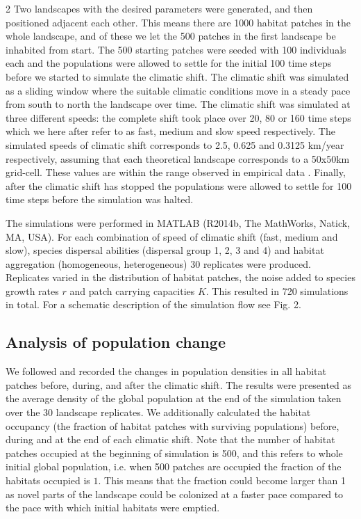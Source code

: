 \documentclass[12pt,pdftex]{article}
\begin{document}
\begin{spacing}{2}
Two landscapes with the desired parameters were generated, and then positioned adjacent each other. This means there are 1000 habitat patches in the whole landscape, and of these we let the 500 patches in the first landscape be inhabited from start. The 500 starting patches were seeded with 100 individuals each and the populations were allowed to settle for the initial 100 time steps before we started to simulate the climatic shift. The climatic shift was simulated as a sliding window where the suitable climatic conditions move in a steady pace from south to north the landscape over time. The climatic shift was simulated at three different speeds: the complete shift took place over 20, 80 or 160 time steps which we here after refer to as fast, medium and slow speed respectively. The simulated speeds of climatic shift corresponds to 2.5, 0.625 and 0.3125 km/year respectively, assuming that each theoretical landscape  corresponds to a 50x50km grid-cell. These values are within the range observed in empirical data \citep{Loarie2009}.  Finally, after the climatic shift has stopped the populations were allowed to settle for 100 time steps before the simulation was halted.

The simulations were performed in MATLAB (R2014b, The MathWorks, Natick, MA, USA). For each combination of speed of climatic shift (fast, medium and slow), species dispersal abilities (dispersal group 1, 2, 3 and 4) and habitat aggregation (homogeneous, heterogeneous) 30 replicates were produced. Replicates varied in the distribution of habitat patches, the noise added to species growth rates $r$ and patch carrying capacities $K$. This resulted in 720 simulations in total. For a schematic description of the simulation flow see Fig. 2.

\subsection*{Analysis of population change}
We followed and recorded the changes in population densities in all habitat patches before, during, and after the climatic shift. The results were presented as the average density of the global population at the end of the simulation taken over the 30 landscape replicates. We additionally calculated the habitat occupancy (the fraction of habitat patches with surviving populations) before, during and at the end of each climatic shift. Note that the number of habitat patches occupied at the beginning of simulation is 500, and this refers to whole initial global population, i.e. when 500 patches are occupied the fraction of the habitats occupied is $1$. This means that the fraction could become larger than 1 as novel parts of the landscape could be colonized at a faster pace compared to the pace with which initial habitats were emptied. 


\end{spacing}
\end{document}
